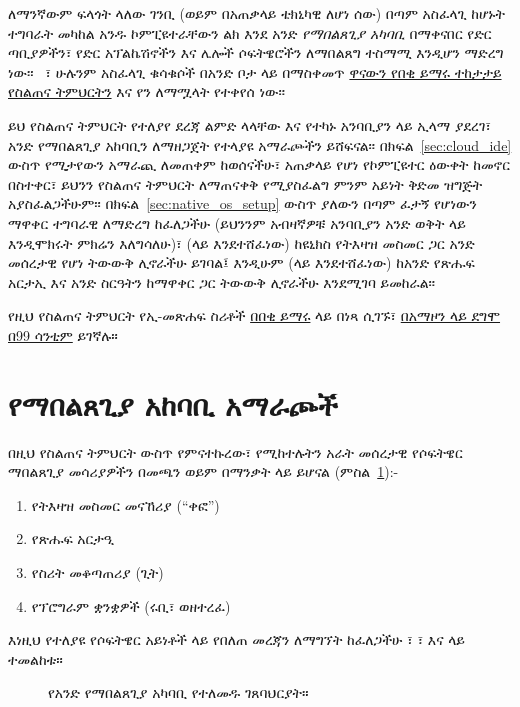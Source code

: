 
\noindent ለማንኛውም ፍላጎት ላለው ገንቢ (ወይም በአጠቃላይ ቴክኒካዊ ለሆነ ሰው) በጣም አስፈላጊ ከሆኑት ተግባራት መካከል አንዱ ኮምፒዩተራቸውን ልክ እንደ አንድ \emph{የማበልጸጊያ አካባቢ} በማቀናበር የድር ጣቢያዎችን፣ የድር አፕልኬሽኖችን እና ሌሎች ሶፍትዌሮችን ለማበልጸግ ተስማሚ እንዲሆን ማድረግ ነው፡፡ \ledev\ ፣ ሁሉንም አስፈላጊ ቁሳቁሶች በአንድ ቦታ ላይ በማስቀመጥ \href{http://www.learnenough.com/tutorials}{ዋናውን የበቂ ይማሩ ተከታታይ የስልጠና ትምህርትን} እና የ\rort\/ን ለማሟላት የተቀየሰ ነው፡፡

ይህ የስልጠና ትምህርት የተለያየ ደረጃ ልምድ ላላቸው እና የተካኑ አንባቢያን ላይ ኢላማ ያደረገ፣ አንድ የማበልጸጊያ አከባቢን ለማዘጋጀት የተላያዩ አማራጮችን ይሸፍናል፡፡ በክፍል~\ref{sec:cloud_ide} ውስጥ የሚታየውን አማራጪ ለመጠቀም ከወሰናችሁ፣ አጠቃላይ የሆነ የኮምፒዩተር ዕውቀት ከመኖር በስተቀር፣ ይህንን የስልጠና ትምህርት ለማጠናቀቅ የሚያስፈልግ ምንም አይነት ቅድመ ዝግጅት አያስፈልጋችሁም፡፡ በክፍል~\ref{sec:native_os_setup} ውስጥ ያለውን በጣም ፈታኝ የሆነውን ማዋቀር ተግባራዊ ለማድረግ ከፈለጋችሁ (ይህንንም አብዛኛዎቹ አንባቢያን አንድ ወቅት ላይ እንዲሞክሩት ምክሬን እለግሳለሁ)፣ (\lecl ላይ እንደተሸፈነው) ከዩኒክስ የትእዛዝ መስመር ጋር አንድ መሰረታዊ የሆነ ትውውቅ ሊኖራችሁ ይገባል፤ እንዲሁም ( ላይ እንደተሸፈነው) ከአንድ የጽሑፍ አርታኢ እና አንድ ስርዓትን ከማዋቀር ጋር ትውውቅ ሊኖራችሁ እንደሚገባ ይመከራል፡፡

የዚህ የስልጠና ትምህርት የኢ-መጽሐፍ ስሪቶች \href{https://www.softcover.io/email-capture/28fdb94f/learn_enough_dev_environment}{በበቂ ይማሩ} ላይ በነጻ ሲገኙ፣ \href{https://www.amazon.com/Learn-Enough-Dev-Environment-Dangerous-ebook/dp/B01MTEQJ6E}{በአማዞን ላይ ደግሞ በ99 ሳንቲም} ይገኛሉ።

\section{የማበልጸጊያ አከባቢ አማራጮች} %
\label{sec:dev_environment_options}

በዚህ የስልጠና ትምህርት ውስጥ የምናተኩረው፣ የሚከተሉትን አራት መሰረታዊ የሶፍትዌር ማበልጸጊያ መሳሪያዎችን በመጫን ወይም በማንቃት ላይ ይሆናል (ምስል~\ref{fig:dev_environment}):-

\begin{enumerate}
  \item የትእዛዝ መስመር መናኸሪያ (``ቀፎ'')
  \item የጽሑፍ አርታዒ
  \item የስሪት መቆጣጠሪያ (ጊት)
  \item የፕሮግራም ቋንቋዎች (ሩቢ፣ ወዘተረፈ)
\end{enumerate}

እነዚህ የተለያዩ የሶፍትዌር አይነቶች ላይ የበለጠ መረጃን ለማግኘት ከፈለጋችሁ \lecl\/፣ \/፣ \leg እና \ler ላይ ተመልከቱ።

\begin{figure}
\begin{center}
\end{center}
\caption{የአንድ የማበልጸጊያ አካባቢ የተለመዱ ገጸባህርያት።\label{fig:dev_environment}}
\end{figure}

